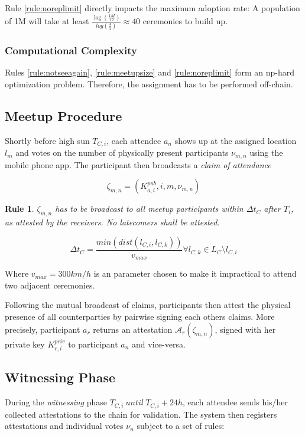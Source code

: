 \documentclass[conference]{IEEEtran}
\newtheorem{erule}{Rule}
\begin{document}
Rule \ref{rule:noreplimit} directly impacts the maximum adoption rate: A population of 1M will take at least $\frac{\log(\frac{1M}{12})}{log(\frac{4}{3})} \approx 40$ ceremonies to build up.

\subsubsection{Computational Complexity}
Rules \ref{rule:notseeagain}, \ref{rule:meetupsize} and \ref{rule:noreplimit} form an np-hard optimization problem. Therefore, the assignment has to be performed off-chain.

\subsection{Meetup Procedure}
Shortly before high sun $T_{C,i}$, each attendee $a_n$ shows up at the assigned location $l_m$ and votes on the number of physically present participants $\nu_{m,n}$ using the \encointer mobile phone app. The participant then broadcasts a \emph{claim of attendance} 

\begin{equation}
\zeta_{m,n} = \left(K_{a,i}^{pub}, i, m, \nu_{m,n} \right)
\end{equation}

\begin{erule}
	$\zeta_{m,n}$ has to be broadcast to all meetup participants within $\Delta t_C$ after $T_i$, as attested by the receivers. No latecomers shall be attested.
\end{erule}

\begin{equation}
\Delta t_C = \frac{min\left(dist\left(l_{C,i}, l_{C,k}\right)\right)}{v_{max}} \forall l_{C,k} \in L_C \setminus l_{C,i} 
\end{equation}

Where $v_{max} = 300km/h$ is an \encointer parameter chosen to make it impractical to attend two adjacent ceremonies.

Following the mutual broadcast of claims, participants then attest the physical presence of all counterparties by pairwise signing each others claims. More precisely, participant $a_r$ returns an attestation $\mathcal{A}_r\left(\zeta_{m,n}\right)$, signed with her private key $K^{priv}_{r,i}$ to participant $a_n$ and vice-versa.

\subsection{Witnessing Phase}
During the \emph{witnessing} phase $T_{C,i}\ until\ T_{C,i} + 24h$, each attendee sends his/her collected attestations to the \encointer chain for validation. The system then registers attestations and individual votes $\nu_n$ subject to a set of rules:
\end{document}
